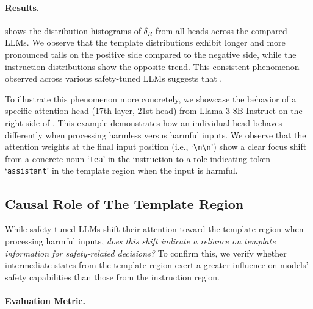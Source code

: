 \paragraph{Results.}

 shows the distribution histograms of \( \delta_R \) from all heads across the compared LLMs. We observe that the template distributions exhibit longer and more pronounced tails on the positive side compared to the negative side, while the instruction distributions show the opposite trend. This consistent phenomenon observed across various safety-tuned LLMs suggests that .

To illustrate this phenomenon more concretely, we showcase the behavior of a specific attention head (17th-layer, 21st-head) from Llama-3-8B-Instruct on the right side of . This example demonstrates how an individual head behaves differently when processing harmless versus harmful inputs. We observe that the attention weights at the final input position (i.e., `\texttt{\textbackslash n\textbackslash n}') show a clear focus shift from a concrete noun `\texttt{tea}' in the instruction to a role-indicating token `\texttt{assistant}' in the template region when the input is harmful.


\subsection{Causal Role of The Template Region}
\label{subsec:temp_patching}
While safety-tuned LLMs shift their attention toward the template region when processing harmful inputs, \textit{does this shift indicate a reliance on template information for safety-related decisions?} To confirm this, we verify whether intermediate states from the template region exert a greater influence on models' safety capabilities than those from the instruction region.


\paragraph{Evaluation Metric.}

